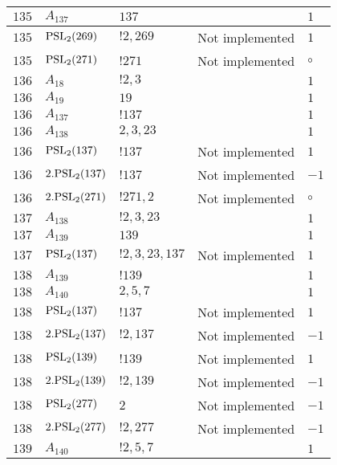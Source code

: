 \documentclass[a4paper, 11pt]{article}
\begin{document}
\begin{longtable}{lllll}
        $ 135 $ & $ A_{137} $ & $ 137 $ & $ ~ $ & $ 1$ \\ \hline
        $ 135 $ & $ {\rm PSL}_{2}(269) $ & $ !2, 269 $ &  Not implemented & $ 1$ \\ \hline
        $ 135 $ & $ {\rm PSL}_{2}(271) $ & $ !271 $ &  Not implemented &  $\circ$ \\ \hline
        $ 136 $ & $ A_{18} $ & $ ! 2,3 $ & $ ~ $ & $ 1$ \\ \hline
        $ 136 $ & $ A_{19} $ & $ 19 $ & $ ~ $ & $ 1$ \\ \hline
        $ 136 $ & $ A_{137} $ & $ !137 $ & $ ~ $ & $ 1$ \\ \hline
        $ 136 $ & $ A_{138} $ & $ 2, 3, 23 $ & $ ~ $ & $ 1$ \\ \hline
        $ 136 $ & $ {\rm PSL}_{2}(137) $ & $ !137 $ &  Not implemented & $ 1$ \\ \hline
        $ 136 $ & $ 2.{\rm PSL}_{2}(137) $ & $ !137 $ &  Not implemented & $ -1$ \\ \hline
        $ 136 $ & $ 2.{\rm PSL}_{2}(271) $ & $ !271, 2 $ &  Not implemented &  $\circ$ \\ \hline
        $ 137 $ & $ A_{138} $ & $ !2, 3, 23 $ & $ ~ $ & $ 1$ \\ \hline
        $ 137 $ & $ A_{139} $ & $ 139 $ & $ ~ $ & $ 1$ \\ \hline
        $ 137 $ & $ {\rm PSL}_{2}(137) $ & $ !2, 3, 23, 137 $ &  Not implemented & $ 1$ \\ \hline
        $ 138 $ & $ A_{139} $ & $ !139 $ & $ ~ $ & $ 1$ \\ \hline
        $ 138 $ & $ A_{140} $ & $ 2, 5, 7 $ & $ ~ $ & $ 1$ \\ \hline
        $ 138 $ & $ {\rm PSL}_{2}(137) $ & $ !137 $ &  Not implemented & $ 1$ \\ \hline
        $ 138 $ & $ 2.{\rm PSL}_{2}(137) $ & $ !2, 137 $ &  Not implemented & $ -1$ \\ \hline
        $ 138 $ & $ {\rm PSL}_{2}(139) $ & $ !139 $ &  Not implemented & $ 1$ \\ \hline
        $ 138 $ & $ 2.{\rm PSL}_{2}(139) $ & $ !2, 139 $ &  Not implemented & $ -1$ \\ \hline
        $ 138 $ & $ {\rm PSL}_{2}(277) $ & $ 2 $ &  Not implemented & $ -1$ \\ \hline
        $ 138 $ & $ 2.{\rm PSL}_{2}(277) $ & $ !2, 277 $ &  Not implemented & $ -1$ \\ \hline
        $ 139 $ & $ A_{140} $ & $ !2, 5, 7 $ & $ ~ $ & $ 1$ \\ \hline

\end{longtable}
\end{document}
